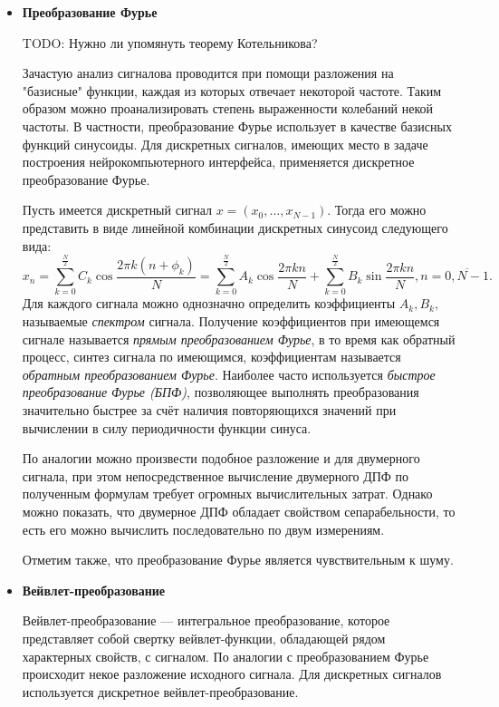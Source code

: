 \documentclass[12pt,fleqn]{article}
\begin{document}
	\begin{itemize}
	\item
	{\bf Преобразование Фурье}
	\par TODO: Нужно ли упомянуть теорему Котельникова?
	\par Зачастую анализ сигналова проводится при помощи разложения на "базисные" функции, каждая из которых отвечает некоторой частоте. Таким образом можно проанализировать степень выраженности колебаний некой частоты. В частности, преобразование Фурье использует в качестве базисных функций синусоиды. Для дискретных сигналов, имеющих место в задаче построения нейрокомпьютерного интерфейса, применяется дискретное преобразование Фурье.
	\par Пусть имеется дискретный сигнал $x = (x_0, \dots, x_{N-1})$. Тогда его можно представить в виде линейной комбинации дискретных синусоид следующего вида:
$$x_n = \sum_{k=0}^{\frac{N}{2}} C_k \cos{\frac{2 \pi k (n + \phi_k)}{N}} = \sum_{k=0}^{\frac{N}{2}} A_k \cos{\frac{2 \pi k n}{N}} + \sum_{k=0}^{\frac{N}{2}} B_k \sin{\frac{2 \pi k n}{N}}, n = \overline{0, N-1}.$$
	Для каждого сигнала можно однозначно определить коэффициенты $A_k, B_k,$ называемые {\it спектром} сигнала. Получение коэффициентов при имеющемся сигнале называется {\it прямым преобразованием Фурье}, в то время как обратный процесс, синтез сигнала по имеющимся, коэффициентам называется {\it обратным преобразованием Фурье}. Наиболее часто используется {\it быстрое преобразование Фурье (БПФ)}, позволяющее выполнять преобразования значительно быстрее за счёт  наличия повторяющихся значений при вычислении в силу периодичности функции синуса. 
	\par По аналогии можно произвести подобное разложение и для двумерного сигнала, при этом непосредственное вычисление двумерного ДПФ по полученным формулам требует огромных вычислительных затрат. Однако можно показать, что двумерное ДПФ обладает свойством сепарабельности, то есть его можно вычислить последовательно по двум измерениям. 
	\par Отметим также, что преобразование Фурье является чувствительным к шуму.
	\item
	{\bf Вейвлет-преобразование}
	\par Вейвлет-преобразование — интегральное преобразование, которое представляет собой свертку вейвлет-функции, обладающей рядом характерных свойств, с сигналом. По аналогии с преобразованием Фурье происходит некое разложение исходного сигнала. Для дискретных сигналов используется дискретное вейвлет-преобразование.

\end{itemize}
\end{document}
